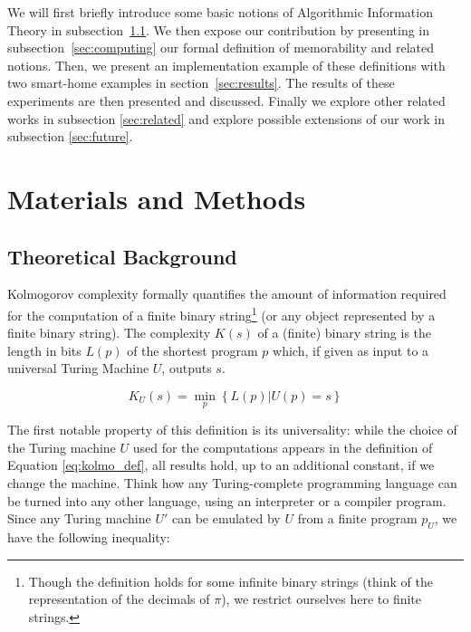 \documentclass[entropy,article,submit,moreauthors,pdftex]{Definitions/mdpi}
\begin{document}
We will first briefly introduce
some basic notions of Algorithmic Information Theory in subsection~\ref{sec:theory}. We then expose our contribution by presenting in subsection~\ref{sec:computing} our formal definition of memorability and related notions. Then, we present an implementation example of these definitions with two smart-home examples in section~\ref{sec:results}. The results of these experiments are then presented and discussed. Finally we explore other related works in subsection \ref{sec:related} and explore possible extensions of our work in subsection \ref{sec:future}.



\section{Materials and Methods}

\subsection{Theoretical Background}
\label{sec:theory}
Kolmogorov complexity formally quantifies the amount of information required
for the computation of a finite binary string\footnote{Though the definition
    holds for some infinite binary strings (think of the representation of the
    decimals of $\pi$), we restrict ourselves here to finite strings.} (or
any object represented by a finite binary
string)\cite{kolmogorov_three_1965,li_introduction_2008}. The complexity $K(s)$ of a (finite) binary string is the length in bits $L(p)$ of the shortest program $p$
which, if given as input to a universal Turing Machine $U$, outputs $s$.

\begin{equation}
    \label{eq:kolmo_def}
    K_{U}(s) = \min_{p}\left\{L(p)|U(p)=s\right\}
\end{equation}

The first notable property of this definition is its universality: while the
choice of the Turing machine $U$ used for the computations appears in the
definition of Equation \ref{eq:kolmo_def}, all results hold, up to an additional
constant, if we change the machine. Think how any Turing-complete programming language can
be turned into any other language, using an interpreter or a compiler program. Since any
Turing machine $U'$ can be emulated by $U$ from a
finite program $p_{U}$, we have the following inequality:
\end{document}
